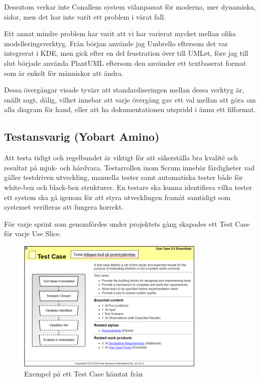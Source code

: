 \documentclass[conference,a4paper]{IEEEtran}
\begin{document}
Dessutom verkar inte Conallens system\cite{Conallen99} välanpassat för moderna, mer dynamiska,
sidor, men det har inte varit ett problem i vårat fall. 

Ett annat mindre problem har varit att vi har varierat mycket mellan olika modelleringsverktyg.
Från början använde jag Umbrello\cite{Umbrello} eftersom det var integrerat i KDE, men gick efter
en del frustration över till UMLet\cite{UMLet}, före jag till slut började använda
PlantUML\cite{PlantUML} eftersom den använder ett textbaserat format som är enkelt för människor att ändra.

Dessa övergångar visade tyvärr att standardiseringen mellan dessa verktyg är, snällt sagt, dålig,
vilket innebar att varje övergång gav ett val mellan att göra om alla diagram för hand, eller att
ha dokumentationen utspridd i ännu ett filformat.

\subsection{Testansvarig (Yobart Amino)}
Att testa tidigt och regelbundet är viktigt för att säkerställa bra kvalité och resultat på mjuk- och hårdvara. Testarrollen inom Scrum innebär färdigheter vad gäller testdriven utveckling, manuella tester samt automatiska tester både för white-box och black-box strukturer. En testare ska kunna identifiera vilka tester ett system ska gå igenom för att styra utvecklingen framåt samtidigt som systemet verifieras att fungera korrekt\cite{ivarjacobson2017}. 

För varje sprint som genomfördes under projektets gång skapades ett Test Case för varje Use Slice. 

\begin{figure}[H]
\centering
\includegraphics[width=9cm]{UserTestExempel}
\caption{Exempel på ett Test Case hämtat från \cite{ivarjacobson2017}}
\label{test-case}
\end{figure}
\end{document}
